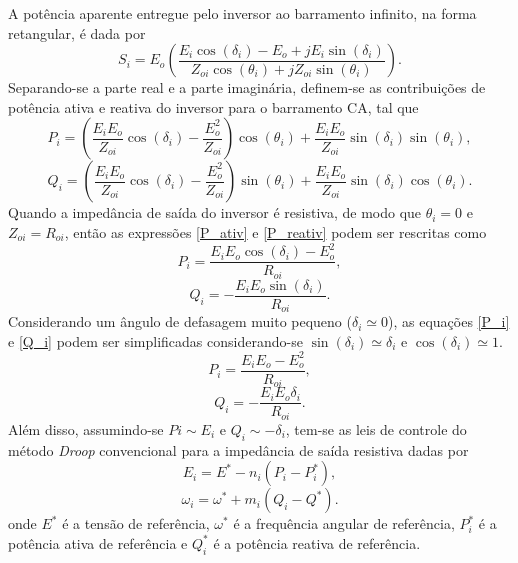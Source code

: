 \begin{example} 
A potência aparente entregue pelo inversor ao barramento infinito, na forma retangular, é dada por
\begin{equation}
S_i = E_o(\dfrac{E_i\cos(\delta_i)-E_o+jE_i\sin(\delta_i)}{Z_{oi}\cos(\theta_i)+jZ_{oi}\sin(\theta_i)}).
\end{equation}
Separando-se  a parte real e a parte imaginária, definem-se as contribuições de potência ativa e reativa do inversor para o barramento CA, tal que
\begin{equation}\label{P_ativ}
P_i = (\dfrac{E_iE_o}{Z_{oi}}\cos(\delta_i)- \dfrac{E_o^2}{Z_{oi}})\cos(\theta_i)+\dfrac{E_iE_o}{Z_{oi}}\sin(\delta_i)\sin(\theta_i),
\end{equation}
\begin{equation}\label{P_reativ}
Q_i = (\dfrac{E_iE_o}{Z_{oi}}\cos(\delta_i)- \dfrac{E_o^2}{Z_{oi}})\sin(\theta_i)+\dfrac{E_iE_o}{Z_{oi}}\sin(\delta_i)\cos(\theta_i).
\end{equation}\label{P_i}
Quando a impedância de saída do inversor é resistiva, de modo que $\theta_i = 0$ e $Z_{oi} = R_{oi}$, então as expressões \ref{P_ativ} e \ref{P_reativ} podem ser rescritas como
\begin{equation}
P_i = \dfrac{E_iE_o\cos(\delta_i)- E_o^2}{R_{oi}},
\end{equation}
\begin{equation}\label{Q_i}
Q_i = -\dfrac{E_iE_o\sin(\delta_i)}{R_{oi}}.
\end{equation}
Considerando um ângulo de defasagem muito pequeno ($\delta_i \simeq 0$), as equações \ref{P_i} e \ref{Q_i} podem ser simplificadas considerando-se $\sin(\delta_i)\simeq\delta_i$ e $\cos(\delta_i)\simeq 1$.
\begin{equation}
P_i = \dfrac{E_iE_o- E_o^2}{R_{oi}},
\end{equation}
\begin{equation}
Q_i = -\dfrac{E_iE_o\delta_i}{R_{oi}}.
\end{equation}
Além disso, assumindo-se $Pi\sim E_i$ e $Q_i\sim -\delta_i$, tem-se as leis de controle do método \textit{Droop} convencional para a impedância de saída resistiva dadas por
\begin{equation}
E_i = E^*-n_i(P_i-P_i^*),
\end{equation}
\begin{equation}\label{lei_contr}
\omega_i = \omega^* + m_i(Q_i - Q^*).
\end{equation}
onde $E^*$ é a tensão de referência, $\omega^*$ é a frequência angular de referência, $P_i^*$ é a potência ativa de referência e $Q_i^*$ é a potência reativa de referência.


\end{example}
